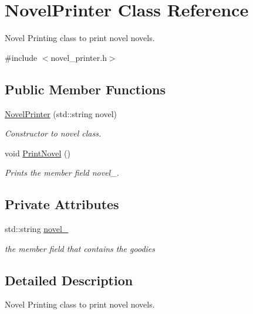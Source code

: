 \hypertarget{classNovelPrinter}{\section{Novel\-Printer Class Reference}
\label{classNovelPrinter}
}


Novel Printing class to print novel novels.  




{\ttfamily \#include $<$novel\-\_\-printer.\-h$>$}

\subsection*{Public Member Functions}
\begin{DoxyCompactItemize}
\item 
\hyperlink{classNovelPrinter_a9b312de4bc12a5de4d2ada68e8c5c50b}{Novel\-Printer} (std\-::string novel)
\begin{DoxyCompactList}\small\item\em Constructor to novel class. \end{DoxyCompactList}\item 
void \hyperlink{classNovelPrinter_a207d50b9fe5bc2e2e90de753e05aa32c}{Print\-Novel} ()
\begin{DoxyCompactList}\small\item\em Prints the member field novel\-\_\-. \end{DoxyCompactList}\end{DoxyCompactItemize}
\subsection*{Private Attributes}
\begin{DoxyCompactItemize}
\item 
std\-::string \hyperlink{classNovelPrinter_a8e9ef645cb7448b9e8c900783c8e52be}{novel\-\_\-}
\begin{DoxyCompactList}\small\item\em the member field that contains the goodies \end{DoxyCompactList}\end{DoxyCompactItemize}


\subsection{Detailed Description}
Novel Printing class to print novel novels. 

